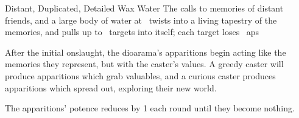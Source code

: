   {Distant, Duplicated, Detailed}%
  {Wax}%
  {Water}%
  {}%
  {The  calls to memories of distant friends, and a large body of water at \spellRange\ twists into a living tapestry of the memories, and pulls up to ~targets into itself; each target loses ~\glspl{ap}}%
  {
  After the initial onslaught, the dioarama's apparitions begin acting like the memories they represent, but with the caster's values.
  A greedy caster will produce apparitions which grab valuables, and a curious caster produces apparitions which spread out, exploring their new world.

  The apparitions' potence reduces by 1 each \gls{round} until they become nothing.}
